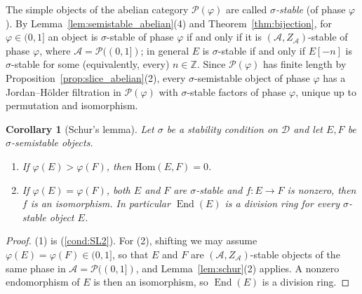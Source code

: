 \documentclass[12pt]{amsart}
\newcommand{\condref}[1]{\textup{(\ref{#1})}}
\newtheorem{corollary}[theorem]{Corollary}
\numberwithin{theorem}{section}
\theoremstyle{definition}
\newcommand{\ZZ}{\mathbb{Z}}
\newcommand{\calA}{\mathcal{A}}
\newcommand{\calP}{\mathcal{P}}
\newcommand{\Hom}{\mathrm{Hom}}
\newcommand{\End}{\operatorname{End}}
\newcommand{\calD}{\mathcal{D}}
\begin{document}
	The simple objects of the abelian category $\calP(\varphi)$ are called \emph{$\sigma$-stable} (of phase $\varphi$).
	By Lemma~\ref{lem:semistable_abelian}(4) and Theorem~\ref{thm:bijection}, for $\varphi \in (0, 1]$ an object is $\sigma$-stable of phase $\varphi$ if and only if it is $(\calA, Z_{\calA})$-stable of phase $\varphi$, where $\calA = \calP((0, 1])$;
	in general $E$ is $\sigma$-stable if and only if $E[-n]$ is $\sigma$-stable for some (equivalently, every) $n \in \ZZ$.
	Since $\calP(\varphi)$ has finite length by Proposition~\ref{prop:slice_abelian}(2), every $\sigma$-semistable object of phase $\varphi$ has a Jordan--H\"older filtration in $\calP(\varphi)$ with $\sigma$-stable factors of phase $\varphi$, unique up to permutation and isomorphism.

	\begin{corollary}[Schur's lemma]
		\label{cor:schur_bridgeland}
		Let $\sigma$ be a stability condition on $\calD$ and let $E, F$ be $\sigma$-semistable objects.
		\begin{enumerate}
			\item If $\varphi(E) > \varphi(F)$, then $\Hom(E, F) = 0$.
			\item If $\varphi(E) = \varphi(F)$, both $E$ and $F$ are $\sigma$-stable and $f \colon E \to F$ is nonzero, then $f$ is an isomorphism.
			In particular $\End(E)$ is a division ring for every $\sigma$-stable object $E$.
		\end{enumerate}
	\end{corollary}

	\begin{proof}
		(1) is \condref{cond:SL2}.
		For (2), shifting we may assume $\varphi(E) = \varphi(F) \in (0, 1]$, so that $E$ and $F$ are $(\calA, Z_{\calA})$-stable objects of the same phase in $\calA = \calP((0, 1])$, and Lemma~\ref{lem:schur}(2) applies.
		A nonzero endomorphism of $E$ is then an isomorphism, so $\End(E)$ is a division ring.
	\end{proof}
\end{document}
